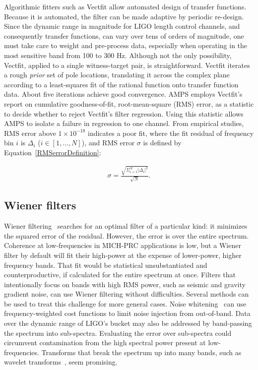             Algorithmic fitters such as Vectfit allow automated design of transfer functions. Because it is automated, the filter can be made adaptive by periodic re-design. Since the dynamic range in magnitude for LIGO length control channels, and consequently transfer functions, can vary over tens of orders of magnitude, one must take care to weight and pre-process data, especially when operating in the most sensitive band from 100 to 300 Hz. Although not the only possibility, Vectfit, applied to a single witness-target pair, is straightforward. Vectfit iterates a rough \textit{prior} set of pole locations, translating it across the complex plane according to a least-squares fit of the rational function onto transfer function data. About five iterations achieve good convergence. AMPS employs Vectfit's report on cumulative goodness-of-fit, root-mean-square (RMS) error, as a statistic to decide whether to reject Vectfit's filter regression. Using this statistic allows AMPS to isolate a failure in regression to one channel. From empirical studies, RMS error above $1\times 10^{-18}$ indicates a poor fit, where the fit residual of frequency bin $i$ is $\Delta_i$ ($i \in [1,...,N]$), and RMS error $\sigma$ is defined by Equation~\ref{RMSerrorDefinition}:

\begin{eqnarray}
\sigma = \frac{\sqrt{\Sigma_{i=1}^N \left| \Delta_i \right|^2}}{\sqrt{N}}\label{RMSerrorDefinition}.
\end{eqnarray}

        \subsection{Wiener filters}
        \label{wiener_filters}

            Wiener filtering~\cite{Wiener1949} searches for an optimal filter of a particular kind: it minimizes the squared error of the residual. However, the error is over the entire spectrum. Coherence at low-frequencies in MICH-PRC applications is low, but a Wiener filter by default will fit their high-power at the expense of lower-power, higher frequency bands. That fit would be statistical unsubstantiated and counterproductive, if calculated for the entire spectrum at once. Filters that intentionally focus on bands with high RMS power, such as seismic and gravity gradient noise, can use Wiener filtering without difficulties. Several methods can be used to treat this challenge for more general cases.  Noise whitening~\cite{Driggers2012NN,DeRosa2012FF} can use frequency-weighted cost functions to limit noise injection from out-of-band. Data over the dynamic range of LIGO's bucket may also be addressed by band-passing the spectrum into sub-spectra. Evaluating the error over sub-spectra could circumvent contamination from the high spectral power present at low-frequencies.  Transforms that break the spectrum up into many bands, such as wavelet transforms~\cite{KlimenkoSite}, seem promising.  

